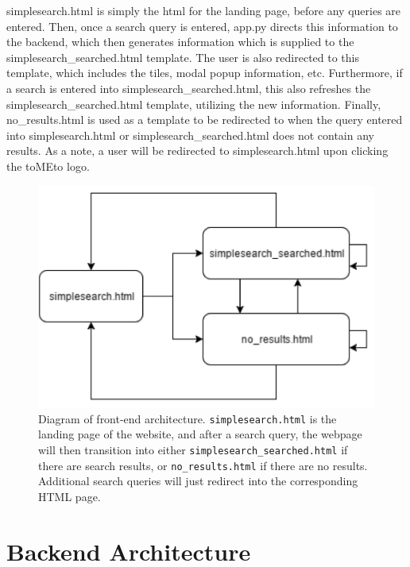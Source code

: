 \documentclass{acm_proc_article-sp}
\begin{document}
simplesearch.html is simply the html for the landing page, before any queries are entered. Then, once a search query is entered, app.py directs this information to the backend, which then generates information which is supplied to the simplesearch\_searched.html template. The user is also redirected to this template, which includes the tiles, modal popup information, etc. Furthermore, if a search is entered into simplesearch\_searched.html, this also refreshes the simplesearch\_searched.html template, utilizing the new information. Finally, no\_results.html is used as a template to be redirected to when the query entered into simplesearch.html or simplesearch\_searched.html does not contain any results. As a note, a user will be redirected to simplesearch.html upon clicking the toMEto logo.

\begin{figure}
\centering
\includegraphics[scale=0.5]{p4.png}
\caption{Diagram of front-end architecture. \texttt{simplesearch.html} is the landing page of the website,
and after a search query, the webpage will then transition into either \texttt{simplesearch\_searched.html} if there are search results, or \texttt{no\_results.html} if there are no results. Additional search queries will just redirect into the corresponding HTML page.}
\end{figure}


\section{Backend Architecture}
\end{document}
